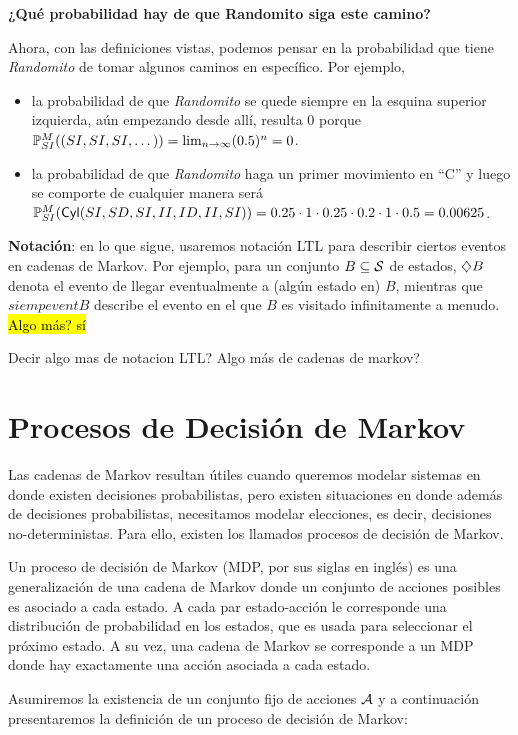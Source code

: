 \textbf{¿Qué probabilidad hay de que Randomito siga este camino?}

Ahora, con las definiciones vistas, podemos pensar en la probabilidad que tiene
\emph{Randomito} de tomar algunos caminos en específico. Por ejemplo,

\begin{itemize}
	\item la probabilidad de que \emph{Randomito} se quede siempre en la esquina superior
	      izquierda, aún empezando desde allí, resulta 0 porque $\mathbb{P}^M_{SI}((SI, SI,
		      SI, \dots)) = \lim_{n\to \infty} (0.5)^n = 0$.
	\item la probabilidad de que \emph{Randomito} haga un primer movimiento en ``C'' y
	      luego se comporte de cualquier manera será $\mathbb{P}^M_{SI}(\textsf{Cyl}(SI, SD, SI, II,
		      ID, II, SI)) = 0.25 \cdot 1 \cdot 0.25 \cdot 0.2 \cdot 1 \cdot 0.5 = 0.00625$.
\end{itemize}

\textbf{Notación}: en lo que sigue, usaremos notación LTL para describir ciertos eventos en cadenas de Markov. Por ejemplo, para un conjunto $B \subseteq \mathcal{S}$ de estados, $\diamondsuit B$ denota el evento de llegar eventualmente a (algún estado en) $B$, mientras que $siempevent B$ describe el evento en el que $B$ es visitado infinitamente a menudo. \hl{Algo más? sí}

Decir algo mas de notacion LTL? Algo más de cadenas de markov?

\section{Procesos de Decisión de Markov}

Las cadenas de Markov resultan útiles cuando queremos modelar sistemas en donde
existen decisiones probabilistas, pero existen situaciones en donde además de
decisiones probabilistas, necesitamos modelar elecciones, es decir, decisiones
no-deterministas. Para ello, existen los llamados procesos de decisión de
Markov.

Un proceso de decisión de Markov (MDP, por sus siglas en inglés) es una
generalización de una cadena de Markov donde un conjunto de acciones posibles
es asociado a cada estado. A cada par estado-acción le corresponde una
distribución de probabilidad en los estados, que es usada para seleccionar el
próximo estado. A su vez, una cadena de Markov se corresponde a un MDP donde
hay exactamente una acción asociada a cada estado.

Asumiremos la existencia de un conjunto fijo de acciones $\mathcal{A}$ y a
continuación presentaremos la definición de un proceso de decisión de Markov:


